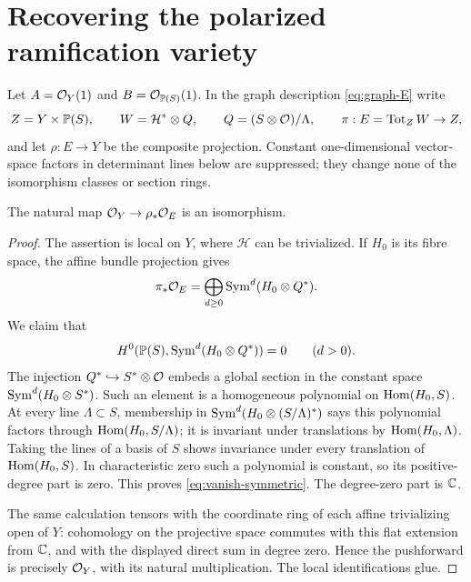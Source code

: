\section{Recovering the polarized ramification variety}
\label{sec:polarization}
Let $A=\mathcal O_Y(1)$ and $B=\mathcal O_{\mathbb P(S)}(1)$. In the graph description
\eqref{eq:graph-E} write
\[
 Z=Y\times\mathbb P(S),\qquad W=\mathcal H^*\otimes Q,
 \qquad Q=(S\otimes\mathcal O)/\Lambda,
 \qquad \pi:E=\operatorname{Tot}_ZW\to Z,
\]
and let $\rho:E\to Y$ be the composite projection. Constant
one-dimensional vector-space factors in determinant lines below are
suppressed; they change none of the isomorphism classes or section rings.

\begin{lemma}\label{lem:no-functions}
The natural map $\mathcal O_Y\to\rho_*\mathcal O_E$ is an isomorphism.
\end{lemma}
\begin{proof}
The assertion is local on $Y$, where $\mathcal H$ can be trivialized.
If $H_0$ is its fibre space, the affine bundle projection gives
\[
 \pi_*\mathcal O_E=\bigoplus_{d\ge0}\operatorname{Sym}^d(H_0\otimes Q^*).
\]
We claim that
\begin{equation}\label{eq:vanish-symmetric}
 H^0(\mathbb P(S),\operatorname{Sym}^d(H_0\otimes Q^*))=0\qquad(d>0).
\end{equation}
The injection $Q^*\hookrightarrow S^*\otimes\mathcal O$ embeds a global
section in the constant space $\operatorname{Sym}^d(H_0\otimes S^*)$.
Such an element is a homogeneous polynomial on $\operatorname{Hom}(H_0,S)$.
At every line $\Lambda\subset S$, membership in
$\operatorname{Sym}^d(H_0\otimes(S/\Lambda)^*)$ says this polynomial factors
through $\operatorname{Hom}(H_0,S/\Lambda)$; it is invariant under translations
by $\operatorname{Hom}(H_0,\Lambda)$. Taking the lines of a basis of $S$ shows
invariance under every translation of $\operatorname{Hom}(H_0,S)$. In characteristic
zero such a polynomial is constant, so its positive-degree part is zero.
This proves \eqref{eq:vanish-symmetric}. The degree-zero part is $\mathbb C$.

The same calculation tensors with the coordinate ring of each affine
trivializing open of $Y$: cohomology on the projective space commutes
with this flat extension from $\mathbb C$, and with the displayed direct sum
in degree zero. Hence the pushforward is precisely $\mathcal O_Y$, with
its natural multiplication. The local identifications glue.
\end{proof}

